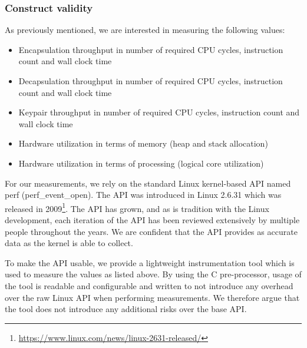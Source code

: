 

\subsubsection{Construct validity}



As previously mentioned, we are interested in measuring the following values:

\begin{itemize}
    \item Encapsulation throughput in number of required CPU cycles, instruction count and wall clock time
    \item Decapsulation throughput in number of required CPU cycles, instruction count and wall clock time
    \item Keypair throughput in number of required CPU cycles, instruction count and wall clock time
    \item Hardware utilization in terms of memory (heap and stack allocation)
    \item Hardware utilization in terms of processing (logical core utilization)
\end{itemize}

For our measurements, we rely on the standard Linux kernel-based API named perf (perf\_event\_open). The API was introduced in Linux 2.6.31 which was released in 2009\footnote{\href{https://www.linux.com/news/linux-2631-released/}{https://www.linux.com/news/linux-2631-released/}}. The API has grown, and as is tradition with the Linux development, each iteration of the API has been reviewed extensively by multiple people throughout the years. We are confident that the API provides as accurate data as the kernel is able to collect.

To make the API usable, we provide a lightweight instrumentation tool which is used to measure the values as listed above. By using the C pre-processor, usage of the tool is readable and configurable and written to not introduce any overhead over the raw Linux API when performing measurements. We therefore argue that the tool does not introduce any additional risks over the base API.

